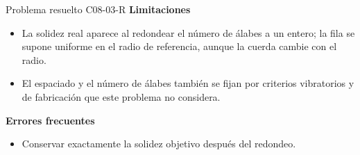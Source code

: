 \documentclass[10pt,openany]{book}
\begin{document}
\begin{studiumworked}{Problema resuelto C08-03-R}
\noindent\textbf{Limitaciones}
\begin{itemize}
\item La solidez real aparece al redondear el número de álabes a un entero; la fila se supone uniforme en el radio de referencia, aunque la cuerda cambie con el radio.
\item El espaciado y el número de álabes también se fijan por criterios vibratorios y de fabricación que este problema no considera.
\end{itemize}

\noindent\textbf{Errores frecuentes}
\begin{itemize}
\item Conservar exactamente la solidez objetivo después del redondeo.
\end{itemize}
\end{studiumworked}
\end{document}
